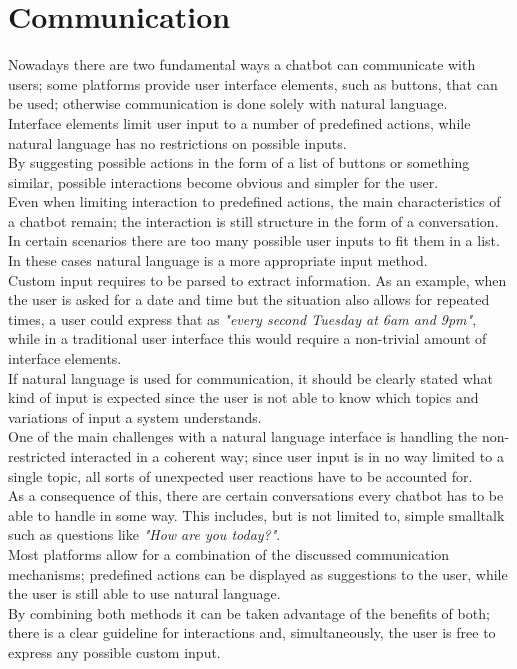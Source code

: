 \section{Communication}
\label{communication}

Nowadays there are two fundamental ways a chatbot can communicate with users;
some platforms provide user interface elements, such as buttons, that can be used;
otherwise communication is done solely with natural language.
\\

Interface elements limit user input to a number of predefined actions,
while natural language has no restrictions on possible inputs.
\\
By suggesting possible actions in the form of a list of buttons or something similar,
possible interactions become obvious and simpler for the user.
\\
Even when limiting interaction to predefined actions,
the main characteristics of a chatbot remain;
the interaction is still structure in the form of a conversation.
\\

In certain scenarios there are too many possible user inputs to fit them in a list.
In these cases natural language is a more appropriate input method.
\\
Custom input requires to be parsed to extract information.
As an example, when the user is asked for a date and time but the situation also allows for repeated times,
a user could express that as \emph{"every second Tuesday at 6am and 9pm"},
while in a traditional user interface this would require a non-trivial amount of interface elements.
\\

If natural language is used for communication,
it should be clearly stated what kind of input is expected
since the user is not able to know which topics and variations of input a system understands.
\\
One of the main challenges with a natural language interface is handling the non-restricted interacted
in a coherent way;
since user input is in no way limited to a single topic,
all sorts of unexpected user reactions have to be accounted for.
\\
As a consequence of this, there are certain conversations every chatbot has to be able to handle in some way.
This includes, but is not limited to, simple smalltalk such as questions like \emph{"How are you today?"}.
\\

Most platforms allow for a combination of the discussed communication mechanisms;
predefined actions can be displayed as suggestions to the user,
while the user is still able to use natural language.
\\
By combining both methods it can be taken advantage of the benefits of both;
there is a clear guideline for interactions and, simultaneously,
the user is free to express any possible custom input.
